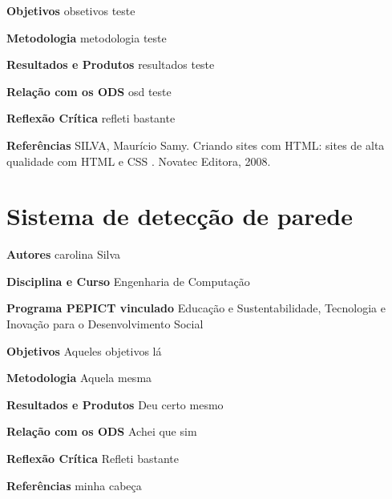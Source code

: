 \documentclass[12pt,openright,oneside,a4paper]{report}
\begin{document}
\vspace{0.7cm}
\noindent
\textbf{Objetivos}
obsetivos teste

\vspace{0.7cm}
\noindent
\textbf{Metodologia}
metodologia teste

\vspace{0.7cm}
\noindent
\textbf{Resultados e Produtos}
resultados teste

\vspace{0.7cm}
\noindent
\textbf{Relação com os ODS}
osd teste

\vspace{0.7cm}
\noindent
\textbf{Reflexão Crítica}
refleti bastante

\vspace{0.7cm}
\noindent
\textbf{Referências}
SILVA, Maurício Samy. Criando sites com HTML: sites de alta qualidade com HTML e CSS . Novatec Editora, 2008.

\vspace{0.7cm}
\section{Sistema de detecção de parede}
\noindent
\textbf{Autores}
carolina Silva

\vspace{0.7cm}
\noindent
\textbf{Disciplina e Curso}
Engenharia de Computação

\vspace{0.7cm}
\noindent
\textbf{Programa PEPICT vinculado}
Educação e Sustentabilidade, Tecnologia e Inovação para o Desenvolvimento Social

\vspace{0.7cm}
\noindent
\textbf{Objetivos}
Aqueles objetivos lá

\vspace{0.7cm}
\noindent
\textbf{Metodologia}
Aquela mesma

\vspace{0.7cm}
\noindent
\textbf{Resultados e Produtos}
Deu certo mesmo

\vspace{0.7cm}
\noindent
\textbf{Relação com os ODS}
Achei que sim

\vspace{0.7cm}
\noindent
\textbf{Reflexão Crítica}
Refleti bastante

\vspace{0.7cm}
\noindent
\textbf{Referências}
minha cabeça

\vspace{0.7cm}
\end{document}

